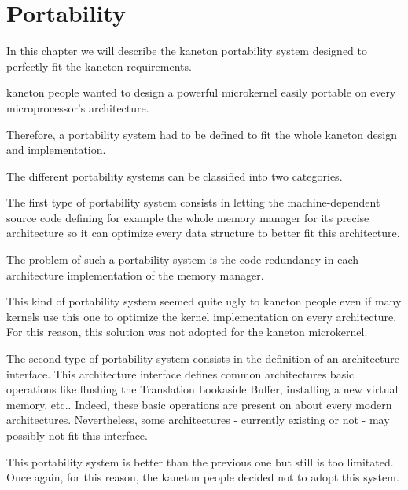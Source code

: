 
%
%

\chapter{Portability}

In this chapter we will describe the kaneton portability system designed
to perfectly fit the kaneton requirements.

\newpage

%
%

kaneton people wanted to design a powerful microkernel easily portable
on every microprocessor's architecture.

Therefore, a portability system had to be defined to fit the whole kaneton
design and implementation.

The different portability systems can be classified into two categories.

The first type of portability system consists in letting the
machine-dependent source code defining for example the whole memory manager
for its precise architecture so it can optimize every data structure to
better fit this architecture.

The problem of such a portability system is the code redundancy in each
architecture implementation of the memory manager.

This kind of portability system seemed quite ugly to kaneton people
even if many kernels use this one to optimize the kernel implementation
on every architecture. For this reason, this solution was not adopted
for the kaneton microkernel.

The second type of portability system consists in the definition of
an architecture interface. This architecture interface defines common
architectures basic operations like flushing the Translation Lookaside Buffer,
installing a new virtual memory, etc.. Indeed, these basic operations
are present on about every modern architectures. Nevertheless, some
architectures - currently existing or not - may possibly not fit this
interface.

This portability system is better than the previous one but still is too
limitated. Once again, for this reason, the kaneton people decided not
to adopt this system.

